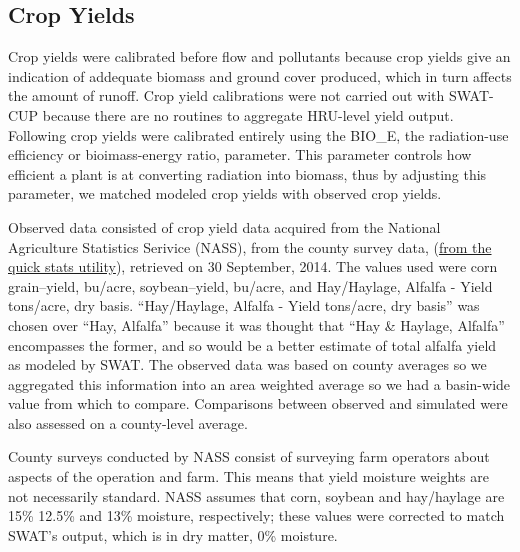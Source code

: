 \subsection{Crop Yields}


Crop yields were calibrated before flow and pollutants because crop yields give an indication of addequate biomass and ground cover produced, which in turn affects the amount of runoff. Crop yield calibrations were not carried out with SWAT-CUP because there are no routines to aggregate HRU-level yield output. Following \citet{baumgart_source_2005} crop yields were calibrated entirely using the BIO\_E, the radiation-use efficiency or bioimass-energy ratio, parameter. This parameter controls how efficient a plant is at converting radiation into biomass, thus by adjusting this parameter, we matched modeled crop yields with observed crop yields.

Observed data consisted of crop yield data acquired from the National Agriculture Statistics Serivice (NASS), from the county survey data, (\href{http://quickstats.nass.usda.gov/results/CD8890FD-566F-3F66-8C8A-CB932E358991}{from the quick stats utility}), retrieved on 30 September, 2014. The values used were corn grain--yield, bu/acre, soybean--yield, bu/acre, and Hay/Haylage, Alfalfa - Yield tons/acre, dry basis. ``Hay/Haylage, Alfalfa - Yield tons/acre, dry basis'' was chosen over ``Hay, Alfalfa'' because it was thought that ``Hay \& Haylage, Alfalfa'' encompasses the former, and so would be a better estimate of total alfalfa yield as modeled by SWAT. The observed data was based on county averages so we aggregated this information into an area weighted average so we had a basin-wide value from which to compare. Comparisons between observed and simulated were also assessed on a county-level average.



County surveys conducted by NASS consist of surveying farm operators about aspects of the operation and farm. This means that yield moisture weights are not necessarily standard. NASS assumes that corn, soybean and hay/haylage are 15\% 12.5\% and 13\% moisture, respectively; these values were corrected to match SWAT's output, which is in dry matter, 0\% moisture. 


